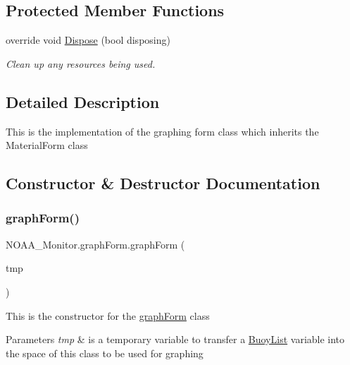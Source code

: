 \subsection*{Protected Member Functions}
\begin{DoxyCompactItemize}
\item 
override void \mbox{\hyperlink{class_n_o_a_a___monitor_1_1graph_form_af498ca1601a85b6ed47927f609d4cb80}{Dispose}} (bool disposing)
\begin{DoxyCompactList}\small\item\em Clean up any resources being used. \end{DoxyCompactList}\end{DoxyCompactItemize}


\subsection{Detailed Description}
This is the implementation of the graphing form class which inherits the Material\+Form class 

\subsection{Constructor \& Destructor Documentation}
\mbox{\label{class_n_o_a_a___monitor_1_1graph_form_a68c6d68e2948df9bc77d6f3d097ee069}} 
\subsubsection{\texorpdfstring{graph\+Form()}{graphForm()}}
{\footnotesize\ttfamily N\+O\+A\+A\+\_\+\+Monitor.\+graph\+Form.\+graph\+Form (\begin{DoxyParamCaption}\item[{\mbox{\hyperlink{class_buoy_list}{Buoy\+List}}}]{tmp }\end{DoxyParamCaption})\hspace{0.3cm}{\ttfamily [inline]}}

This is the constructor for the \mbox{\hyperlink{class_n_o_a_a___monitor_1_1graph_form}{graph\+Form}} class 
\begin{DoxyParams}{Parameters}
{\em tmp} & is a temporary variable to transfer a \mbox{\hyperlink{class_buoy_list}{Buoy\+List}} variable into the space of this class to be used for graphing \\
\hline
\end{DoxyParams}


